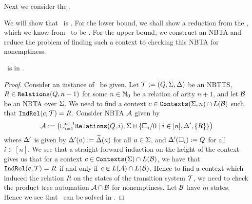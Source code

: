 Next we consider the \relationRealisabilityFull.
\begin{problem}
    \problemtitle{\relationRealisabilityFull}
\end{problem}
We will show that \relationRealisabilityFull\ is \exptc. For the lower bound, we shall show a reduction from the \intersectionNonemptinessFull, which we know from~\cite{tata} to be \exptc. For the upper bound, we construct an NBTA and reduce the problem of finding such a context to checking this NBTA for nonemptiness.

\begin{theorem}\label{thm:relationRealisabilityProblemUpperBound}
    \relationRealisabilityFull\ is in \expt.
\end{theorem}

\begin{proof}
    Consider an instance of \relationRealisabilityFull\ be given. Let $\mathcal{T} := (Q, \Sigma, \Delta)$ be an NBTTS, $R \in \texttt{Relations}(Q, n+1)$ for some $n \in \mathbb{N}_0$ be a relation of arity $n+1$, and let $\mathcal{B}$ be an NBTA over $\Sigma$. We need to find a context $c \in \texttt{Contexts}(\Sigma, n) \cap L(\mathcal{B})$ such that $\texttt{IndRel}(c, \mathcal{T}) = R$. Consider NBTA $\mathcal{A}$ given by
    \[ \mathcal{A} := \left( \cup_{i=1}^{n+1}\texttt{Relations}(Q, i), \Sigma \uplus \left\{ \square_i/0 \mid i \in [n], \Delta', \left\{ R \right\} \right\} \right) \]
    where $\Delta'$ is given by $\Delta'(a) := \widetilde{\Delta}(a)$ for all $a \in \Sigma$, and $\Delta'(\square_i) := Q$ for all $i \in [n]$.
    We see that a straight-forward induction on the height of the context gives us that for a context $c \in \texttt{Contexts}(\Sigma) \cap L(\mathcal{B})$, we have that $\texttt{IndRel}(c, \mathcal{T}) = R$ if and only if $c \in L(\mathcal{A}) \cap L(\mathcal{B})$.
    Hence to find a context which induced the relation $R$ on the states of the transition system $\mathcal{T}$, we need to check the product tree automation $\mathcal{A} \cap \mathcal{B}$ for nonemptiness. Let $\mathcal{B}$ have $m$ states.
    Hence we see that \relationRealisabilityFull\ can be solved in \expt.
\end{proof}

